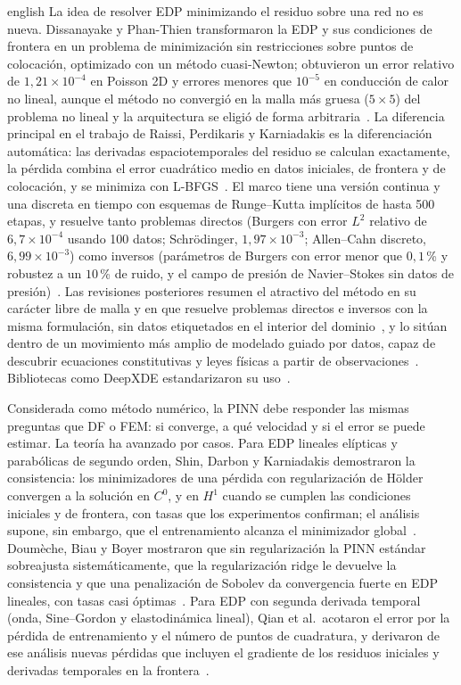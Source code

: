 \documentclass[../0000.tex]{subfiles}
\begin{document}
\begin{hyphenrules}{english}
La idea de resolver EDP minimizando el residuo sobre una red no es nueva. Dissanayake y Phan-Thien transformaron la EDP y sus condiciones de frontera en un problema de minimización sin restricciones sobre puntos de colocación, optimizado con un método cuasi-Newton; obtuvieron un error relativo de $1{,}21\times10^{-4}$ en Poisson 2D y errores menores que $10^{-5}$ en conducción de calor no lineal, aunque el método no convergió en la malla más gruesa ($5\times5$) del problema no lineal y la arquitectura se eligió de forma arbitraria~\cite{dissanayake1994}. La diferencia principal en el trabajo de Raissi, Perdikaris y Karniadakis es la diferenciación automática: las derivadas espaciotemporales del residuo se calculan exactamente, la pérdida combina el error cuadrático medio en datos iniciales, de frontera y de colocación, y se minimiza con L-BFGS~\cite{raissi2017a,raissi2019}. El marco tiene una versión continua y una discreta en tiempo con esquemas de Runge--Kutta implícitos de hasta 500 etapas, y resuelve tanto problemas directos (Burgers con error $L^2$ relativo de $6{,}7\times10^{-4}$ usando 100 datos; Schrödinger, $1{,}97\times10^{-3}$; Allen--Cahn discreto, $6{,}99\times10^{-3}$) como inversos (parámetros de Burgers con error menor que $0{,}1$\,\% y robustez a un $10$\,\% de ruido, y el campo de presión de Navier--Stokes sin datos de presión)~\cite{raissi2017a,raissi2017b,raissi2019}. Las revisiones posteriores resumen el atractivo del método en su carácter libre de malla y en que resuelve problemas directos e inversos con la misma formulación, sin datos etiquetados en el interior del dominio~\cite{cuomo2022,luo2025physics}, y lo sitúan dentro de un movimiento más amplio de modelado guiado por datos, capaz de descubrir ecuaciones constitutivas y leyes físicas a partir de observaciones~\cite{montans2019data}. Bibliotecas como DeepXDE estandarizaron su uso~\cite{lu2021deepxde}.

Considerada como método numérico, la PINN debe responder las mismas preguntas que DF o FEM: si converge, a qué velocidad y si el error se puede estimar. La teoría ha avanzado por casos. Para EDP lineales elípticas y parabólicas de segundo orden, Shin, Darbon y Karniadakis demostraron la consistencia: los minimizadores de una pérdida con regularización de Hölder convergen a la solución en $C^0$, y en $H^1$ cuando se cumplen las condiciones iniciales y de frontera, con tasas que los experimentos confirman; el análisis supone, sin embargo, que el entrenamiento alcanza el minimizador global~\cite{shin2020convergence}. Doumèche, Biau y Boyer mostraron que sin regularización la PINN estándar sobreajusta sistemáticamente, que la regularización ridge le devuelve la consistencia y que una penalización de Sobolev da convergencia fuerte en EDP lineales, con tasas casi óptimas~\cite{doumeche2025convergence}. Para EDP con segunda derivada temporal (onda, Sine--Gordon y elastodinámica lineal), Qian et al.\ acotaron el error por la pérdida de entrenamiento y el número de puntos de cuadratura, y derivaron de ese análisis nuevas pérdidas que incluyen el gradiente de los residuos iniciales y derivadas temporales en la frontera~\cite{qian2023}.


\end{hyphenrules}
\end{document}
